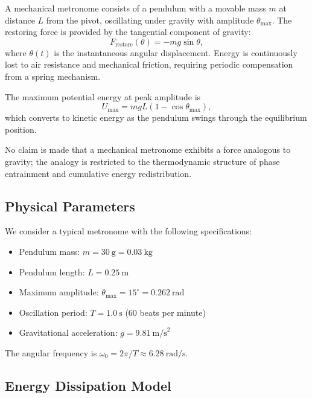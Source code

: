 \documentclass[%
 reprint,
 amsmath,amssymb,
 aps,
 prb,
]{revtex4-2}
\numberwithin{equation}{section}
\begin{document}
A mechanical metronome consists of a pendulum with a movable mass $m$ at distance $L$ from the pivot, oscillating under gravity with amplitude $\theta_\text{max}$. The restoring force is provided by the tangential component of gravity:
\begin{equation}
F_\text{restore}(\theta) = -mg\sin\theta,
\label{eq:metronome_restoring_force}
\end{equation}
where $\theta(t)$ is the instantaneous angular displacement. Energy is continuously lost to air resistance and mechanical friction, requiring periodic compensation from a spring mechanism.

The maximum potential energy at peak amplitude is
\begin{equation}
U_\text{max} = mgL(1 - \cos\theta_\text{max}),
\label{eq:metronome_potential}
\end{equation}
which converts to kinetic energy as the pendulum swings through the equilibrium position.

No claim is made that a mechanical metronome exhibits a force analogous to gravity; the analogy is restricted to the thermodynamic structure of phase entrainment and cumulative energy redistribution.

\subsection{Physical Parameters}
\label{app:parameters}

We consider a typical metronome with the following specifications:

\begin{itemize}
\item Pendulum mass: $m = 30~\text{g} = 0.03~\text{kg}$
\item Pendulum length: $L = 0.25~\text{m}$
\item Maximum amplitude: $\theta_\text{max} = 15^\circ = 0.262~\text{rad}$
\item Oscillation period: $T = 1.0~\text{s}$ (60 beats per minute)
\item Gravitational acceleration: $g = 9.81~\text{m/s}^2$
\end{itemize}

The angular frequency is $\omega_0 = 2\pi/T \approx 6.28~\text{rad/s}$.

\subsection{Energy Dissipation Model}
\label{app:dissipation}
\end{document}
